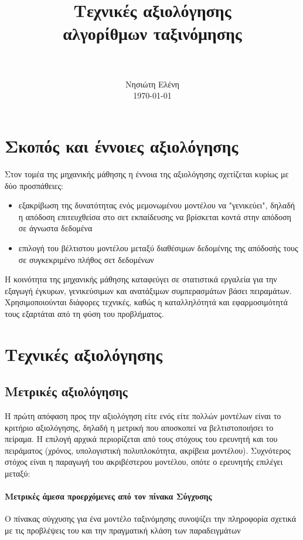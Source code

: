 \documentclass[]{article}
\title{
	\usefont{OT1}{bch}{b}{n}
	\normalfont \normalsize \textsc{} \\ 
	\horrule{0.5pt} \\[0.4cm]
	\huge Τεχνικές αξιολόγησης \\αλγορίθμων ταξινόμησης \\
	\horrule{2pt} \\[0.5cm]
}
\author{
	\normalfont 								\normalsize
	Νησιώτη Ελένη\\[-3pt]		\normalsize
	\today
}
\date{}
\numberwithin{equation}{section}		%
\numberwithin{figure}{section}			%
\numberwithin{table}{section}				%
\begin{document}
	\maketitle
    \section{Σκοπός και έννοιες αξιολόγησης} 
    Στον τομέα της μηχανικής μάθησης η έννοια της αξιολόγησης σχετίζεται κυρίως με δύο προσπάθειες:
    \begin{itemize}
    	\item εξακρίβωση της δυνατότητας ενός μεμονωμένου μοντέλου να "γενικεύει", δηλαδή η απόδοση επιτευχθείσα στο σετ εκπαίδευσης να βρίσκεται κοντά στην απόδοση σε άγνωστα δεδομένα
    	\item επιλογή του βέλτιστου μοντέλου μεταξύ διαθέσιμων δεδομένης της απόδοσής τους σε συγκεκριμένο πλήθος σετ δεδομένων 
    \end{itemize}
    
    Η κοινότητα της μηχανικής μάθησης καταφεύγει σε στατιστικά εργαλεία για την εξαγωγή έγκυρων, γενικεύσιμων και ανατάξιμων συμπερασμάτων βάσει πειραμάτων. Χρησιμοποιούνται διάφορες τεχνικές, καθώς η καταλληλότητά και εφαρμοσιμότητά τους εξαρτάται από τη φύση του προβλήματος.
    \section{Τεχνικές αξιολόγησης}
    \subsection{Μετρικές αξιολόγησης}
    Η πρώτη απόφαση προς την αξιολόγηση είτε ενός είτε πολλών μοντέλων είναι το κριτήριο αξιολόγησης, δηλαδή η μετρική που αποσκοπεί να βελτιστοποιήσει το πείραμα. Η επιλογή αρχικά περιορίζεται από τους στόχους του ερευνητή και του πειράματος (χρόνος, υπολογιστική πολυπλοκότητα, ακρίβεια μοντέλου). Συχνότερος στόχος είναι η παραγωγή του ακριβέστερου μοντέλου, οπότε ο ερευνητής επιλέγει μεταξύ:
    \paragraph{Μετρικές άμεσα προερχόμενες από τον πίνακα Σύγχυσης}
    Ο πίνακας σύγχυσης για ένα μοντέλο ταξινόμησης συνοψίζει την πληροφορία σχετικά με τις προβλέψεις του και την πραγματική κλάση των παραδειγμάτων
	
\end{document}

